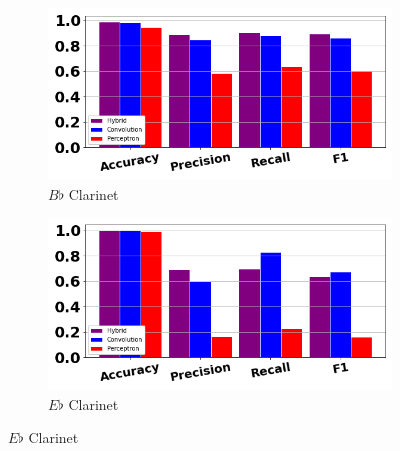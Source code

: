 \documentclass[12pt,letterpaper]{article}
\begin{document}
\begin{figure}[H]
	\begin{subfigure}[b]{0.45\textwidth}
	\centering
	\includegraphics[width=\textwidth]{../FiguresClasses/BbClarinet}
	\caption{$B\flat$ Clarinet}
	\end{subfigure}	
	\hfill
	\begin{subfigure}[b]{0.45\textwidth}
	\centering
	\includegraphics[width=\textwidth]{../FiguresClasses/EbClarinet}
	\caption{$E\flat$ Clarinet}
	\end{subfigure}	
	

\end{figure}
\end{document}
